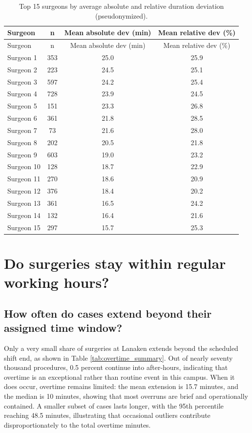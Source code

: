 \documentclass[
]{article}
\begin{document}
\begin{longtable}[]{@{}lccc@{}}
\caption{Top 15 surgeons by average absolute and relative duration
deviation (pseudonymized). \label{tab:surgeon_deviation}}\tabularnewline
\toprule\noalign{}
Surgeon & n & Mean absolute dev (min) & Mean relative dev (\%) \\
\midrule\noalign{}
\endfirsthead
\toprule\noalign{}
Surgeon & n & Mean absolute dev (min) & Mean relative dev (\%) \\
\midrule\noalign{}
\endhead
\bottomrule\noalign{}
\endlastfoot
Surgeon 1 & 353 & 25.0 & 25.9 \\
Surgeon 2 & 223 & 24.5 & 25.1 \\
Surgeon 3 & 597 & 24.2 & 25.4 \\
Surgeon 4 & 728 & 23.9 & 24.5 \\
Surgeon 5 & 151 & 23.3 & 26.8 \\
Surgeon 6 & 361 & 21.8 & 28.5 \\
Surgeon 7 & 73 & 21.6 & 28.0 \\
Surgeon 8 & 202 & 20.5 & 21.8 \\
Surgeon 9 & 603 & 19.0 & 23.2 \\
Surgeon 10 & 128 & 18.7 & 22.9 \\
Surgeon 11 & 270 & 18.6 & 20.9 \\
Surgeon 12 & 376 & 18.4 & 20.2 \\
Surgeon 13 & 361 & 16.5 & 24.2 \\
Surgeon 14 & 132 & 16.4 & 21.6 \\
Surgeon 15 & 297 & 15.7 & 25.3 \\
\end{longtable}

\newpage

\section{Do surgeries stay within regular working
hours?}\label{do-surgeries-stay-within-regular-working-hours}

\subsection{How often do cases extend beyond their assigned time
window?}\label{how-often-do-cases-extend-beyond-their-assigned-time-window}

Only a very small share of surgeries at Lanaken extends beyond the
scheduled shift end, as shown in Table \ref{tab:overtime_summary}. Out
of nearly seventy thousand procedures, 0.5 percent continue into
after-hours, indicating that overtime is an exceptional rather than
routine event in this campus. When it does occur, overtime remains
limited: the mean extension is 15.7 minutes, and the median is 10
minutes, showing that most overruns are brief and operationally
contained. A smaller subset of cases lasts longer, with the 95th
percentile reaching 48.5 minutes, illustrating that occasional outliers
contribute disproportionately to the total overtime minutes.
\end{document}
